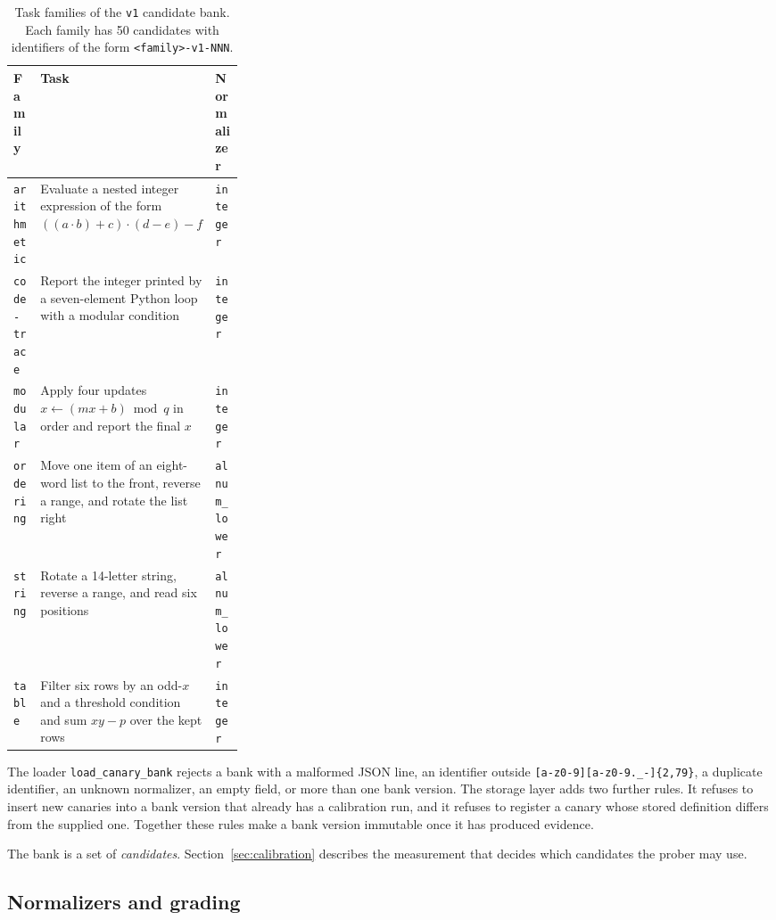 \begin{table}[htbp]
  \centering
  \small
  \begin{tabularx}{\linewidth}{@{}p{0.14\linewidth}Xp{0.16\linewidth}@{}}
    \toprule
    Family & Task & Normalizer \\
    \midrule
    \texttt{arithmetic} & Evaluate a nested integer expression of the form
      $((a \cdot b) + c) \cdot (d - e) - f$ & \texttt{integer} \\
    \texttt{code-trace} & Report the integer printed by a seven-element Python
      loop with a modular condition & \texttt{integer} \\
    \texttt{modular} & Apply four updates $x \leftarrow (m x + b) \bmod q$ in
      order and report the final $x$ & \texttt{integer} \\
    \texttt{ordering} & Move one item of an eight-word list to the front,
      reverse a range, and rotate the list right & \texttt{alnum\_lower} \\
    \texttt{string} & Rotate a 14-letter string, reverse a range, and read six
      positions & \texttt{alnum\_lower} \\
    \texttt{table} & Filter six rows by an odd-$x$ and a threshold condition and
      sum $xy - p$ over the kept rows & \texttt{integer} \\
    \bottomrule
  \end{tabularx}
  \caption{Task families of the \texttt{v1} candidate bank. Each family has 50
  candidates with identifiers of the form \texttt{<family>-v1-NNN}.}
  \label{tab:families}
\end{table}

The loader \texttt{load\_canary\_bank} rejects a bank with a malformed JSON
line, an identifier outside \texttt{[a-z0-9][a-z0-9.\_-]\{2,79\}}, a duplicate
identifier, an unknown normalizer, an empty field, or more than one bank
version. The storage layer adds two further rules. It refuses to insert new
canaries into a bank version that already has a calibration run, and it
refuses to register a canary whose stored definition differs from the supplied
one. Together these rules make a bank version immutable once it has produced
evidence.

The bank is a set of \emph{candidates}. Section~\ref{sec:calibration} describes
the measurement that decides which candidates the prober may use.

\subsection{Normalizers and grading}
\label{sec:grading}

